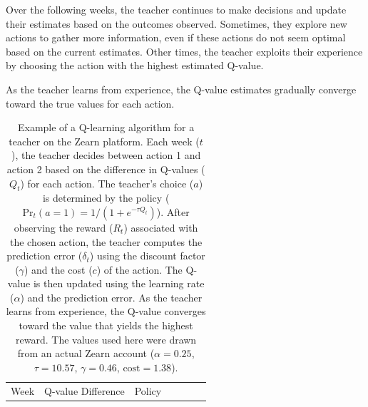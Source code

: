\documentclass[
  number,
  preprint,
  3p,
  onecolumn]{elsarticle}
\begin{document}
Over the following weeks, the teacher continues to make decisions and
update their estimates based on the outcomes observed. Sometimes, they
explore new actions to gather more information, even if these actions do
not seem optimal based on the current estimates. Other times, the
teacher exploits their experience by choosing the action with the
highest estimated Q-value.

As the teacher learns from experience, the Q-value estimates gradually
converge toward the true values for each action.

\begin{longtable}[]{@{}
  >{\raggedright\arraybackslash}p{}
  >{\raggedright\arraybackslash}p{}
  >{\raggedright\arraybackslash}p{}
  >{\raggedright\arraybackslash}p{}
  >{\raggedright\arraybackslash}p{}
  >{\raggedright\arraybackslash}p{}
  >{\raggedright\arraybackslash}p{}@{}}
\caption{Example of a Q-learning algorithm for a teacher on the Zearn
platform. Each week (\(t\)), the teacher decides between action 1 and
action 2 based on the difference in Q-values (\(Q_t\)) for each action.
The teacher's choice (\(a\)) is determined by the policy
(\(\text{Pr}_t(a = 1)=1/(1+e^{-\tau Q_t})\)). After observing the reward
(\(R_t\)) associated with the chosen action, the teacher computes the
prediction error (\(\delta_t\)) using the discount factor (\(\gamma\))
and the cost (\(c\)) of the action. The Q-value is then updated using
the learning rate (\(\alpha\)) and the prediction error. As the teacher
learns from experience, the Q-value converges toward the value that
yields the highest reward. The values used here were drawn from an
actual Zearn account (\(\alpha = 0.25\), \(\tau = 10.57\),
\(\gamma = 0.46\),
\(\text{cost} = 1.38\)).}\label{tbl-qvalue-example}\tabularnewline
\toprule\noalign{}
\begin{minipage}[b]{\linewidth}\raggedright
Week
\end{minipage} & \begin{minipage}[b]{\linewidth}\raggedright
Q-value Difference
\end{minipage} & \begin{minipage}[b]{\linewidth}\raggedright
Policy
\end{minipage} & \begin{minipage}[b]{\linewidth}\raggedright

\end{minipage}
\end{longtable}
\end{document}
